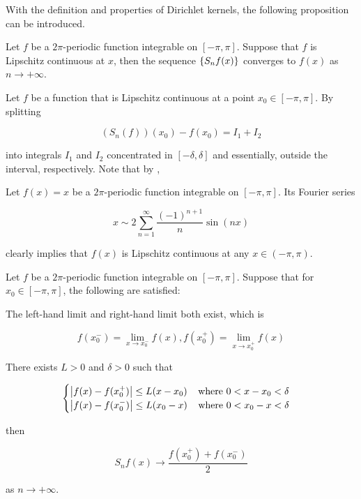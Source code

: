 \documentclass[a4paper,12pt]{article}
\begin{document}
With the definition and properties of Dirichlet kernels, the following proposition can be introduced.\n

\begin{pst}
  Let $f$ be a $2\pi$-periodic function integrable on $[-\pi,\pi]$. Suppose that $f$ is Lipschitz continuous at $x$, then the sequence $\left\{ S_{n}f(x)\right\}$ converges to $f(x)$ as $n\to+\infty$.\n

  \prf Let $f$ be a function that is Lipschitz continuous at a point $x_{0}\in[-\pi,\pi]$. By splitting
  
  $$(S_{n}(f))(x_{0})-f(x_{0})=I_{1}+I_{2}$$\s

  into integrals $I_{1}$ and $I_{2}$ concentrated in $[-\delta,\delta]$ and essentially, outside the interval, respectively. Note that by \rpst[\sctr{1}],
\end{pst}\n

\begin{exm}
  Let $f(x)=x$ be a $2\pi$-periodic function integrable on $[-\pi,\pi]$. Its Fourier series

  $$x\sim 2\sum_{n=1}^{\infty}\frac{(-1)^{n+1}}{n}\sin(nx)$$\s

  clearly implies that $f(x)$ is Lipschitz continuous at any $x\in(-\pi,\pi)$.
\end{exm}\n

\begin{pst}
  Let $f$ be a $2\pi$-periodic function integrable on $[-\pi,\pi]$. Suppose that for $x_{0}\in[-\pi,\pi]$, the following are satisfied:

  \begin{alist}
    \item The left-hand limit and right-hand limit both exist, which is
    
    $$f(x^{-}_{0})=\lim_{x\to x^{-}_{0}}f(x),f(x^{+}_{0})=\lim_{x\to x^{+}_{0}}f(x)$$

    \item There exists $L>0$ and $\delta>0$ such that
    
    $$\begin{cases}
      \left| f(x)-f(x^{+}_{0})\right|\leq L(x-x_{0})\;\;\;\;\text{where }0<x-x_{0}<\delta\\
      \left| f(x)-f(x^{-}_{0})\right|\leq L(x_{0}-x)\;\;\;\;\text{where }0<x_{0}-x<\delta
    \end{cases}$$
  \end{alist}

  then

  $$S_{n}f(x)\to\frac{f(x^{+}_{0})+f(x^{-}_{0})}{2}$$\s

  as $n\to+\infty$.
\end{pst}\n
\end{document}
